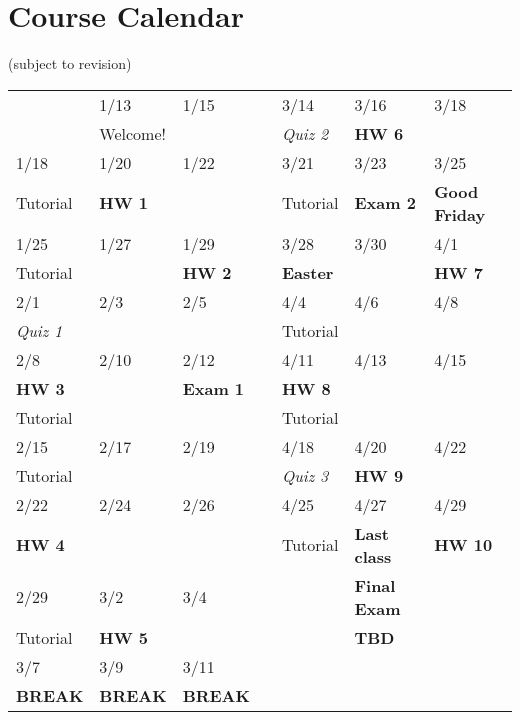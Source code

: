 \documentclass[11pt]{article}
\begin{document}
\section{Course Calendar}
\label{sec-11}
(subject to revision)
\begin{center}
\begin{tabular}{lllllll}
\hline
 & 1/13 & 1/15 & \quad\quad\quad\quad & 3/14 & 3/16 & 3/18\\
 & Welcome! &  &  & \emph{Quiz 2} & \textbf{HW 6} & \\
\hline
1/18 & 1/20 & 1/22 &  & 3/21 & 3/23 & 3/25\\
Tutorial & \textbf{HW 1} &  &  & Tutorial & \textbf{Exam 2} & \textbf{Good Friday}\\
\hline
1/25 & 1/27 & 1/29 &  & 3/28 & 3/30 & 4/1\\
Tutorial &  & \textbf{HW 2} &  & \textbf{Easter} &  & \textbf{HW 7}\\
\hline
2/1 & 2/3 & 2/5 &  & 4/4 & 4/6 & 4/8\\
\emph{Quiz 1} &  &  &  & Tutorial &  & \\
\hline
2/8 & 2/10 & 2/12 &  & 4/11 & 4/13 & 4/15\\
\textbf{HW 3} &  & \textbf{Exam 1} &  & \textbf{HW 8} &  & \\
Tutorial &  &  &  & Tutorial &  & \\
\hline
2/15 & 2/17 & 2/19 &  & 4/18 & 4/20 & 4/22\\
Tutorial &  &  &  & \emph{Quiz 3} & \textbf{HW 9} & \\
\hline
2/22 & 2/24 & 2/26 &  & 4/25 & 4/27 & 4/29\\
\textbf{HW 4} &  &  &  & Tutorial & \textbf{Last class} & \textbf{HW 10}\\
\hline
2/29 & 3/2 & 3/4 &  &  & \textbf{Final Exam} & \\
Tutorial & \textbf{HW 5} &  &  &  & \textbf{TBD} & \\
\hline
3/7 & 3/9 & 3/11 &  &  &  & \\
\textbf{BREAK} & \textbf{BREAK} & \textbf{BREAK} &  &  &  & \\
\hline
\end{tabular}
\end{center}
\end{document}
